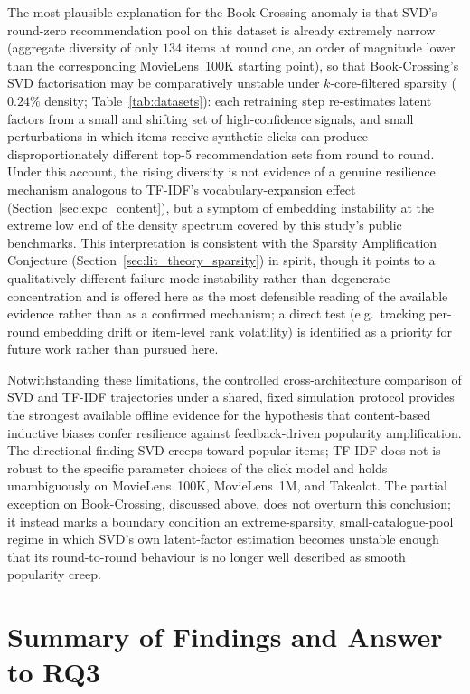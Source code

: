 \documentclass[11pt,a4paper]{report}
\begin{document}
The most plausible explanation for the Book-Crossing anomaly is that SVD's round-zero recommendation pool on this dataset is already extremely narrow (aggregate diversity of only $134$ items at round one, an order of magnitude lower than the corresponding MovieLens~100K starting point), so that Book-Crossing's SVD factorisation may be comparatively unstable under $k$-core-filtered sparsity ($0.24\%$ density; Table~\ref{tab:datasets}): each retraining step re-estimates latent factors from a small and shifting set of high-confidence signals, and small perturbations in which items receive synthetic clicks can produce disproportionately different top-5 recommendation sets from round to round. Under this account, the rising diversity is not evidence of a genuine resilience mechanism analogous to TF-IDF's vocabulary-expansion effect (Section~\ref{sec:expc_content}), but a symptom of embedding instability at the extreme low end of the density spectrum covered by this study's public benchmarks. This interpretation is consistent with the Sparsity Amplification Conjecture (Section~\ref{sec:lit_theory_sparsity}) in spirit, though it points to a qualitatively different failure mode instability rather than degenerate concentration and is offered here as the most defensible reading of the available evidence rather than as a confirmed mechanism; a direct test (e.g.\ tracking per-round embedding drift or item-level rank volatility) is identified as a priority for future work rather than pursued here.

Notwithstanding these limitations, the controlled cross-architecture comparison of SVD and TF-IDF trajectories under a shared, fixed simulation protocol provides the strongest available offline evidence for the hypothesis that content-based inductive biases confer resilience against feedback-driven popularity amplification. The directional finding SVD creeps toward popular items; TF-IDF does not is robust to the specific parameter choices of the click model and holds unambiguously on MovieLens~100K, MovieLens~1M, and Takealot. The partial exception on Book-Crossing, discussed above, does not overturn this conclusion; it instead marks a boundary condition an extreme-sparsity, small-catalogue-pool regime in which SVD's own latent-factor estimation becomes unstable enough that its round-to-round behaviour is no longer well described as smooth popularity creep.

\section{Summary of Findings and Answer to RQ3}
\label{sec:expc_summary}
\end{document}
